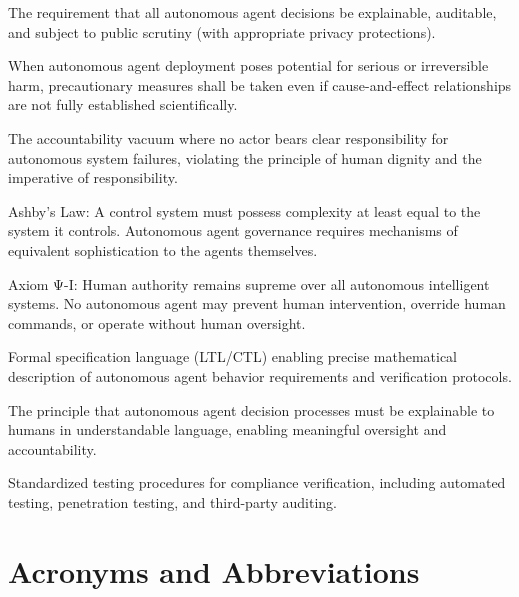 \begin{description}[style=nextline,labelwidth=3cm]
\item[\textbf{Operational Transparency}]
The requirement that all autonomous agent decisions be explainable, auditable, and subject to public scrutiny (with appropriate privacy protections).

\item[\textbf{Precautionary Principle}]
When autonomous agent deployment poses potential for serious or irreversible harm, precautionary measures shall be taken even if cause-and-effect relationships are not fully established scientifically.

\item[\textbf{Responsibility Gap}]
The accountability vacuum where no actor bears clear responsibility for autonomous system failures, violating the principle of human dignity and the imperative of responsibility.

\item[\textbf{Requisite Variety}]
Ashby's Law: A control system must possess complexity at least equal to the system it controls. Autonomous agent governance requires mechanisms of equivalent sophistication to the agents themselves.

\item[\textbf{Suprematia Humana}]
Axiom Ψ-I: Human authority remains supreme over all autonomous intelligent systems. No autonomous agent may prevent human intervention, override human commands, or operate without human oversight.

\item[\textbf{Temporal Logic}]
Formal specification language (LTL/CTL) enabling precise mathematical description of autonomous agent behavior requirements and verification protocols.

\item[\textbf{Transparency}]
The principle that autonomous agent decision processes must be explainable to humans in understandable language, enabling meaningful oversight and accountability.

\item[\textbf{Verification Protocol}]
Standardized testing procedures for compliance verification, including automated testing, penetration testing, and third-party auditing.

\end{description}

\vspace{1cm}

\section*{Acronyms and Abbreviations}

